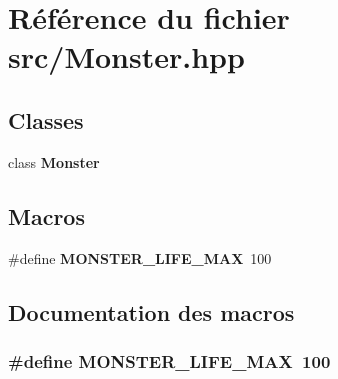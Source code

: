 \section{Référence du fichier src/\-Monster.hpp}
\label{_monster_8hpp}
\subsection*{Classes}
\begin{DoxyCompactItemize}
\item 
class {\bf Monster}
\end{DoxyCompactItemize}
\subsection*{Macros}
\begin{DoxyCompactItemize}
\item 
\#define {\bf M\-O\-N\-S\-T\-E\-R\-\_\-\-L\-I\-F\-E\-\_\-\-M\-A\-X}~100
\end{DoxyCompactItemize}


\subsection{Documentation des macros}
\subsubsection[{M\-O\-N\-S\-T\-E\-R\-\_\-\-L\-I\-F\-E\-\_\-\-M\-A\-X}]{\setlength{\rightskip}{0pt plus 5cm}\#define M\-O\-N\-S\-T\-E\-R\-\_\-\-L\-I\-F\-E\-\_\-\-M\-A\-X~100}\label{_monster_8hpp_a3e7c38d0ba27447b95e04b715793bce7}
